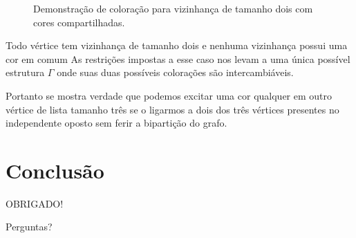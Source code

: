 \documentclass[9pt, compress]{beamer}
\begin{document}
     \begin{frame}
       \begin{figure}[H]
     \centering
     \fontsize{5}{10}
     
     \caption{Demonstração de coloração para vizinhança de tamanho dois com cores compartilhadas.}
   \end{figure}
     \end{frame}
     \begin{frame}{Todo vértice tem vizinhança de tamanho dois e nenhuma vizinhança possui uma cor em comum}
       As restrições impostas a esse caso nos levam a uma única possível estrutura $\Gamma$ onde suas duas possíveis colorações são intercambiáveis.
       
       Portanto se mostra verdade que podemos excitar uma cor qualquer em outro vértice de lista tamanho três se o ligarmos a dois dos três vértices presentes no independente oposto sem ferir a bipartição do grafo.
     \end{frame}
     \section{Conclusão}
     \begin{frame}[standout]
       OBRIGADO!
       
       Perguntas?
     \end{frame}
\end{document}
